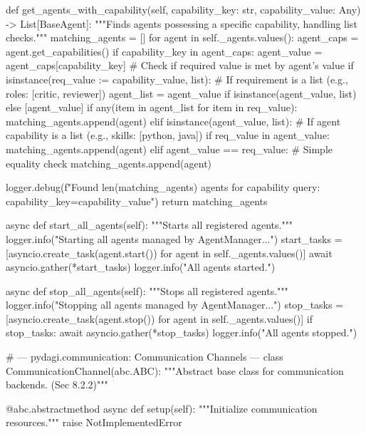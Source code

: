 \documentclass{amsbook}
\theoremstyle{definition}
\theoremstyle{remark}
\numberwithin{equation}{chapter} %
\begin{document}
\begin{python}
    def get_agents_with_capability(self, capability_key: str, capability_value: Any) -> List[BaseAgent]:
        """Finds agents possessing a specific capability, handling list checks."""
        matching_agents = []
        for agent in self._agents.values():
            agent_caps = agent.get_capabilities()
            if capability_key in agent_caps:
                agent_value = agent_caps[capability_key]
                # Check if required value is met by agent's value
                if isinstance(req_value := capability_value, list):
                    # If requirement is a list (e.g., roles: [critic, reviewer])
                    agent_list = agent_value if isinstance(agent_value, list) else [agent_value]
                    if any(item in agent_list for item in req_value):
                        matching_agents.append(agent)
                elif isinstance(agent_value, list):
                    # If agent capability is a list (e.g., skills: [python, java])
                    if req_value in agent_value:
                        matching_agents.append(agent)
                elif agent_value == req_value:
                    # Simple equality check
                    matching_agents.append(agent)

        logger.debug(f"Found {len(matching_agents)} agents for capability query: {capability_key}={capability_value}")
        return matching_agents

    async def start_all_agents(self):
        """Starts all registered agents."""
        logger.info("Starting all agents managed by AgentManager...")
        start_tasks = [asyncio.create_task(agent.start()) for agent in self._agents.values()]
        await asyncio.gather(*start_tasks)
        logger.info("All agents started.")

    async def stop_all_agents(self):
        """Stops all registered agents."""
        logger.info("Stopping all agents managed by AgentManager...")
        stop_tasks = [asyncio.create_task(agent.stop()) for agent in self._agents.values()]
        if stop_tasks:
             await asyncio.gather(*stop_tasks)
        logger.info("All agents stopped.")

# --- pydagi.communication: Communication Channels ---
class CommunicationChannel(abc.ABC):
    """Abstract base class for communication backends. (Sec 8.2.2)"""

    @abc.abstractmethod
    async def setup(self):
        """Initialize communication resources."""
        raise NotImplementedError


\end{python}
\end{document}
